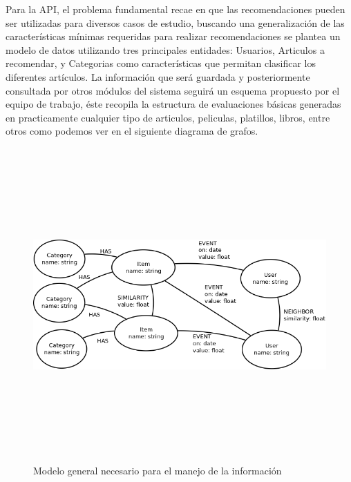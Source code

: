 Para la API, el problema fundamental recae en que las recomendaciones pueden ser utilizadas para diversos casos de estudio, buscando una generalización de las características mínimas requeridas para realizar recomendaciones se plantea un modelo de datos utilizando tres principales entidades: Usuarios, Articulos a recomendar, y Categorias como características que permitan clasificar los diferentes artículos. La información que será guardada y posteriormente consultada por otros módulos del sistema seguirá un esquema propuesto por el equipo de trabajo, éste recopila la estructura de evaluaciones básicas generadas en practicamente cualquier tipo de articulos, peliculas, platillos, libros, entre otros como podemos ver en el siguiente diagrama de grafos.

\newpage
    \begin{landscape}
      \begin{figure}[h!]
      \centering
      \includegraphics[width=22.5cm,height=12cm]{./images/general_data_model.png}
      \caption{Modelo general necesario para el manejo de la información}
    \end{figure}
    \end{landscape}
  \newpage
